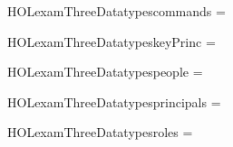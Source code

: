 \newcommand{\HOLexamThreeDate}{19 March 2020}
\newcommand{\HOLexamThreeTime}{06:15}
\begin{SaveVerbatim}{HOLexamThreeDatatypescommands}
 =  \HOLTokenBar{} 
\end{SaveVerbatim}
\newcommand{\HOLexamThreeDatatypescommands}{\UseVerbatim{HOLexamThreeDatatypescommands}}
\begin{SaveVerbatim}{HOLexamThreeDatatypeskeyPrinc}
 =   \HOLTokenBar{}   \HOLTokenBar{}  
\end{SaveVerbatim}
\newcommand{\HOLexamThreeDatatypeskeyPrinc}{\UseVerbatim{HOLexamThreeDatatypeskeyPrinc}}
\begin{SaveVerbatim}{HOLexamThreeDatatypespeople}
 =  \HOLTokenBar{} 
\end{SaveVerbatim}
\newcommand{\HOLexamThreeDatatypespeople}{\UseVerbatim{HOLexamThreeDatatypespeople}}
\begin{SaveVerbatim}{HOLexamThreeDatatypesprincipals}
 =   \HOLTokenBar{}  
\end{SaveVerbatim}
\newcommand{\HOLexamThreeDatatypesprincipals}{\UseVerbatim{HOLexamThreeDatatypesprincipals}}
\begin{SaveVerbatim}{HOLexamThreeDatatypesroles}
 =  \HOLTokenBar{} 
\end{SaveVerbatim}
\newcommand{\HOLexamThreeDatatypesroles}{\UseVerbatim{HOLexamThreeDatatypesroles}}
\newcommand{\HOLexamThreeDatatypes}{
\HOLexamThreeDatatypescommands\HOLexamThreeDatatypeskeyPrinc\HOLexamThreeDatatypespeople\HOLexamThreeDatatypesprincipals\HOLexamThreeDatatypesroles}
